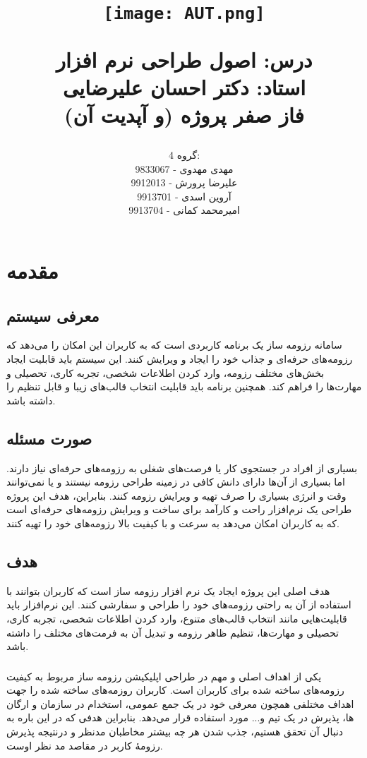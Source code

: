 \documentclass[]{article}
\title{
	\begin{center}
		\texttt{[image: AUT.png]}
	\end{center}	
	
	\LARGE
	درس: اصول طراحی نرم افزار \\
	\Large
	استاد: دکتر احسان علیرضایی \\
	\Large
	فاز صفر پروژه (و آپدیت آن)

}
\author{
	گروه 4: \\
	مهدی مهدوی - 9833067 \\
	علیرضا پرورش - 9912013 \\
	آروین اسدی - 9913701 \\
	امیرمحمد کمانی - 9913704
}
\begin{document}
	\maketitle
	\thispagestyle{empty}
	\newpage
	\tableofcontents
	\newpage

	\fontsize{12pt}{14pt}
	\LARGE


	\section{\huge{مقدمه}}
	\subsection{\LARGE{معرفی سیستم}}
	سامانه رزومه ساز یک برنامه کاربردی است که به کاربران این امکان را می‌دهد که رزومه‌های حرفه‌ای و جذاب خود را ایجاد و ویرایش کنند. این سیستم باید قابلیت ایجاد بخش‌های مختلف رزومه، وارد کردن اطلاعات شخصی، تجربه کاری، تحصیلی و مهارت‌ها را فراهم کند. همچنین برنامه باید قابلیت انتخاب قالب‌های زیبا و قابل تنظیم را داشته باشد.
	
	
	\subsection{\LARGE{صورت مسئله}}
	
	بسیاری از افراد در جستجوی کار یا فرصت‌های شغلی به رزومه‌های حرفه‌ای نیاز دارند. اما بسیاری از آن‌ها دارای دانش کافی در زمینه طراحی رزومه نیستند و یا نمی‌توانند وقت و انرژی بسیاری را صرف تهیه و ویرایش رزومه کنند. بنابراین، هدف این پروژه طراحی یک نرم‌افزار راحت و کارآمد برای ساخت و ویرایش رزومه‌های حرفه‌ای است که به کاربران امکان می‌دهد به سرعت و با کیفیت بالا رزومه‌های خود را تهیه کنند.
	
	\subsection{\LARGE{هدف}}
	
	هدف اصلی این پروژه ایجاد یک نرم‌ افزار رزومه ساز است که کاربران بتوانند با استفاده از آن به راحتی رزومه‌های خود را طراحی و سفارشی کنند. این نرم‌افزار باید قابلیت‌هایی مانند انتخاب قالب‌های متنوع، وارد کردن اطلاعات شخصی، تجربه کاری، تحصیلی و مهارت‌ها، تنظیم ظاهر رزومه و تبدیل آن به فرمت‌های مختلف را داشته باشد.
	
	\subsubsection{\Large{}}
	یکی از اهداف اصلی و مهم در طراحی اپلیکیشن رزومه ساز مربوط به کیفیت رزومه‌های ساخته شده برای کاربران است. 
	کاربران روزمه‌های ساخته شده را جهت اهداف مختلفی همچون معرفی خود در یک جمع عمومی، استخدام در سازمان و ارگان ها، پذیرش در یک تیم و... مورد استفاده قرار می‌دهد.
	بنابراین هدفی که در این باره به دنبال آن تحقق هستیم، جذب شدن هر چه بیشتر مخاطبان مدنظر و درنتیجه پذیرش رزومۀ کاربر در مقاصد مد نظر اوست.
	
\end{document}
